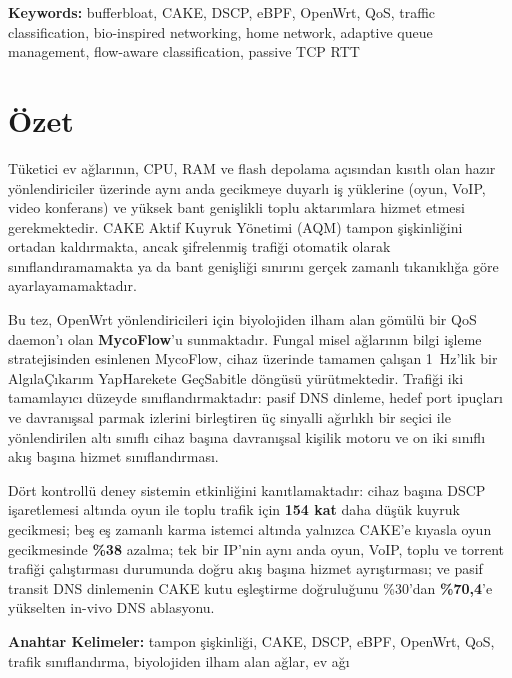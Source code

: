 \vspace{1cm}
\noindent\textbf{Keywords:} bufferbloat, CAKE, DSCP, eBPF, OpenWrt, QoS, traffic classification, bio-inspired networking, home network, adaptive queue management, flow-aware classification, passive TCP RTT

\chapter*{Özet}

Tüketici ev ağlarının, CPU, RAM ve flash depolama açısından kısıtlı olan hazır yönlendiriciler üzerinde aynı anda gecikmeye duyarlı iş yüklerine (oyun, VoIP, video konferans) ve yüksek bant genişlikli toplu aktarımlara hizmet etmesi gerekmektedir. CAKE Aktif Kuyruk Yönetimi (AQM) tampon şişkinliğini ortadan kaldırmakta, ancak şifrelenmiş trafiği otomatik olarak sınıflandıramamakta ya da bant genişliği sınırını gerçek zamanlı tıkanıklığa göre ayarlayamamaktadır.

Bu tez, OpenWrt yönlendiricileri için biyolojiden ilham alan gömülü bir QoS daemon'ı olan \textbf{MycoFlow}'u sunmaktadır. Fungal misel ağlarının bilgi işleme stratejisinden esinlenen MycoFlow, cihaz üzerinde tamamen çalışan 1~Hz'lik bir Algıla\textrightarrow{}Çıkarım Yap\textrightarrow{}Harekete Geç\textrightarrow{}Sabitle döngüsü yürütmektedir. Trafiği iki tamamlayıcı düzeyde sınıflandırmaktadır: pasif DNS dinleme, hedef port ipuçları ve davranışsal parmak izlerini birleştiren üç sinyalli ağırlıklı bir seçici ile yönlendirilen altı sınıflı cihaz başına davranışsal kişilik motoru ve on iki sınıflı akış başına hizmet sınıflandırması.

Dört kontrollü deney sistemin etkinliğini kanıtlamaktadır: cihaz başına DSCP işaretlemesi altında oyun ile toplu trafik için \textbf{154 kat} daha düşük kuyruk gecikmesi; beş eş zamanlı karma istemci altında yalnızca CAKE'e kıyasla oyun gecikmesinde \textbf{\%38} azalma; tek bir IP'nin aynı anda oyun, VoIP, toplu ve torrent trafiği çalıştırması durumunda doğru akış başına hizmet ayrıştırması; ve pasif transit DNS dinlemenin CAKE kutu eşleştirme doğruluğunu \%30'dan \textbf{\%70,4}'e yükselten in-vivo DNS ablasyonu.

\vspace{1cm}
\noindent\textbf{Anahtar Kelimeler:} tampon şişkinliği, CAKE, DSCP, eBPF, OpenWrt, QoS, trafik sınıflandırma, biyolojiden ilham alan ağlar, ev ağı
